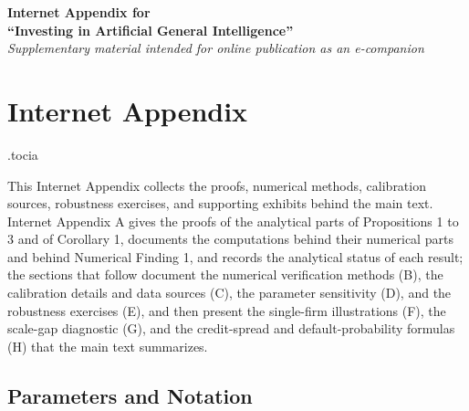 \documentclass[
  11pt,
  letterpaper,
]{scrartcl}
\newcounter{none} %
\begin{document}
\clearpage
\thispagestyle{empty}
\begin{center}
\vspace*{0.08\textheight}
{\Large\bfseries Internet Appendix for}\\[1.2em]
{\Large\bfseries ``Investing in Artificial General Intelligence''}\\[3em]
{\large\itshape Supplementary material intended for online publication as an e-companion}
\label{ia-cover}%
\end{center}
\vspace{3em}
\tableofcontents

\clearpage
\setcounter{page}{1}
\setcounter{table}{0}
\setcounter{figure}{0}
\setcounter{equation}{0}
\renewcommand{\thetable}{IA\arabic{table}}
\renewcommand{\thefigure}{IA\arabic{figure}}
\renewcommand{\theequation}{IA\arabic{equation}}

\section*{Internet Appendix}\label{internet-appendix}

\etocdepthtag.toc{ia}

This Internet Appendix collects the proofs, numerical methods,
calibration sources, robustness exercises, and supporting exhibits
behind the main text. Internet Appendix A gives the proofs of the
analytical parts of Propositions 1 to 3 and of Corollary 1, documents
the computations behind their numerical parts and behind Numerical
Finding 1, and records the analytical status of each result; the
sections that follow document the numerical verification methods (B),
the calibration details and data sources (C), the parameter sensitivity
(D), and the robustness exercises (E), and then present the single-firm
illustrations (F), the scale-gap diagnostic (G), and the credit-spread
and default-probability formulas (H) that the main text summarizes.

\subsection*{Parameters and Notation}\label{parameters-and-notation}
\end{document}
